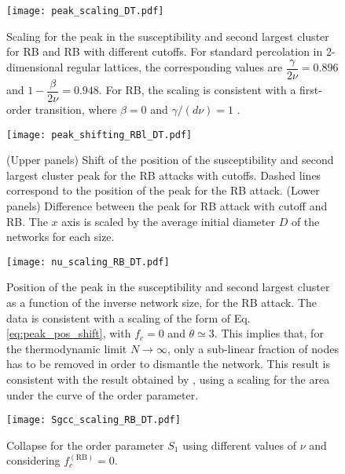 \documentclass{article}
\begin{document}
\begin{figure}
\centering
\texttt{[image: peak\_scaling\_DT.pdf]}
\caption{Scaling for the peak in the susceptibility and second largest cluster for RB and RB with different cutoffs. For standard percolation in 2-dimensional regular lattices, the corresponding values are $\dfrac{\gamma}{2\nu} = 0.896$ and $1-\dfrac{\beta}{2\nu} = 0.948$. For RB, the scaling is consistent with a first-order transition, where $\beta = 0$ and $\gamma/(d\nu) = 1$ \cite{Binder1981,Binder1984,Cho2009}. }
\end{figure}

\begin{figure}
\centering
\texttt{[image: peak\_shifting\_RBl\_DT.pdf]}
\caption{(Upper panels) Shift of the position of the susceptibility and second largest cluster peak for the RB attacks with cutoffs. Dashed lines correspond to the position of the peak for the RB attack. (Lower panels) Difference between the peak for RB attack with cutoff and RB. The $x$ axis is scaled by the average initial diameter $D$ of the networks for each size.}
\end{figure}

\begin{figure}
\centering
\texttt{[image: nu\_scaling\_RB\_DT.pdf]}
\caption{Position of the peak in the susceptibility and second largest cluster as a function of the inverse network size, for the RB attack. The data is consistent with a scaling of the form of Eq. \ref{eq:peak_pos_shift}, with $f_c = 0$ and $\theta \simeq 3$. This implies that, for the thermodynamic limit $N\rightarrow \infty$, only a sub-linear fraction of nodes has to be removed in order to dismantle the network. This result is consistent with the result obtained by \cite{Norrenbrock2016FragmentationAttacks}, using a scaling for the area under the curve of the order parameter.}
\end{figure}

\begin{figure}
\centering
\texttt{[image: Sgcc\_scaling\_RB\_DT.pdf]}
\caption{Collapse for the order parameter $S_1$ using different values of $\nu$ and considering $f_c^{\mathrm{(RB)}} = 0$.}
\end{figure}
\end{document}
